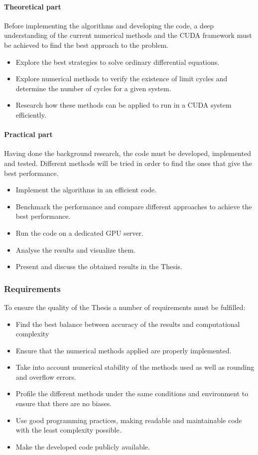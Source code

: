\paragraph{Theoretical part}

Before implementing the algorithms and developing the code, a deep understanding
of the current numerical methods and the CUDA framework must be achieved to find
the best approach to the problem.

\begin{itemize}
    \item Explore the best strategies to solve ordinary differential equations.
    \item Explore numerical methods to verify the existence of limit cycles and determine the number of cycles for a given system.
    \item Research how these methods can be applied to run in a CUDA system efficiently.
\end{itemize}

\paragraph{Practical part} Having done the background research, the code must be
developed, implemented and tested.  Different methods will be tried in order to
find the ones that give the best performance.

\begin{itemize}
    \item Implement the algorithms in an efficient code.
    \item Benchmark the performance and compare different approaches to achieve the best performance.
    \item Run the code on a dedicated GPU server.
    \item Analyse the results and visualize them.
    \item Present and discuss the obtained results in the Thesis.
\end{itemize}

\subsubsection{Requirements}

To ensure the quality of the Thesis a number of requirements must be fulfilled:
\begin{itemize}
    \item Find the best balance between accuracy of the results and computational complexity
    \item Ensure that the numerical methods applied are properly implemented.
    \item Take into account numerical stability of the methods used as well as rounding and overflow errors.
    \item Profile the different methods under the same conditions and environment to ensure that there are no biases.
    \item Use good programming practices, making readable and maintainable code with the least complexity possible.
    \item Make the developed code publicly available.
\end{itemize}

